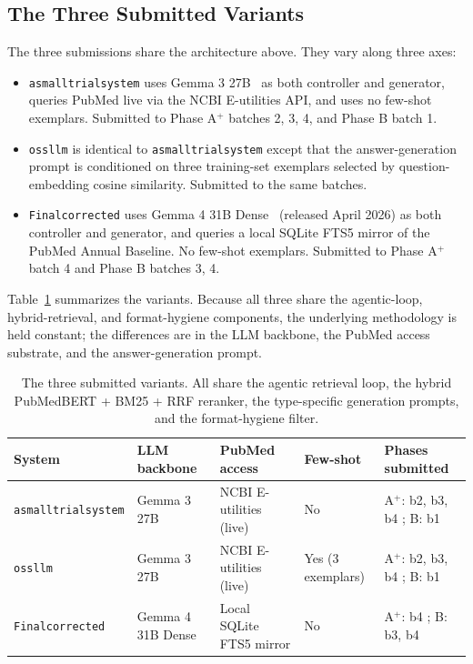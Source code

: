 \documentclass[sigconf,natbib=true]{ceurart}
\begin{document}
\subsection{The Three Submitted Variants}
\label{subsec:variants}

The three submissions share the architecture above. They vary along three axes:

\begin{itemize}
\item \texttt{asmalltrialsystem} uses Gemma 3 27B~\cite{gemma3} as both controller and generator, queries PubMed live via the NCBI E-utilities API, and uses no few-shot exemplars. Submitted to Phase A$^+$ batches 2, 3, 4, and Phase B batch 1.
\item \texttt{ossllm} is identical to \texttt{asmalltrialsystem} except that the answer-generation prompt is conditioned on three training-set exemplars selected by question-embedding cosine similarity. Submitted to the same batches.
\item \texttt{Finalcorrected} uses Gemma 4 31B Dense~\cite{gemma4} (released April 2026) as both controller and generator, and queries a local SQLite FTS5 mirror of the PubMed Annual Baseline. No few-shot exemplars. Submitted to Phase A$^+$ batch 4 and Phase B batches 3, 4.
\end{itemize}

Table~\ref{tab:systems} summarizes the variants. Because all three share the agentic-loop, hybrid-retrieval, and format-hygiene components, the underlying methodology is held constant; the differences are in the LLM backbone, the PubMed access substrate, and the answer-generation prompt.

\begin{table}[t]
\centering
\small
\begin{tabular}{lllll}
\toprule
\textbf{System} & \textbf{LLM backbone} & \textbf{PubMed access} & \textbf{Few-shot} & \textbf{Phases submitted} \\
\midrule
\texttt{asmalltrialsystem} & Gemma 3 27B & NCBI E-utilities (live) & No & A$^+$: b2, b3, b4 ; B: b1 \\
\texttt{ossllm}            & Gemma 3 27B & NCBI E-utilities (live) & Yes (3 exemplars) & A$^+$: b2, b3, b4 ; B: b1 \\
\texttt{Finalcorrected}    & Gemma 4 31B Dense & Local SQLite FTS5 mirror & No & A$^+$: b4 ; B: b3, b4 \\
\bottomrule
\end{tabular}
\caption{The three submitted variants. All share the agentic retrieval loop, the hybrid PubMedBERT + BM25 + RRF reranker, the type-specific generation prompts, and the format-hygiene filter.}
\label{tab:systems}
\end{table}
\end{document}
